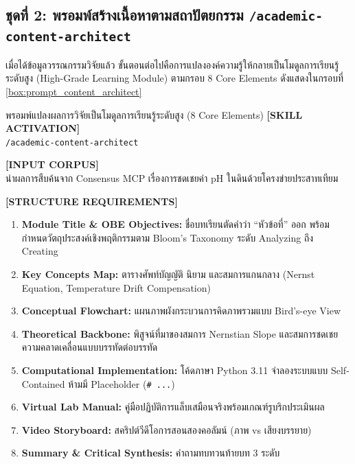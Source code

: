 \subsection{ชุดที่ 2: พรอมพ์สร้างเนื้อหาตามสถาปัตยกรรม \texttt{/academic-content-architect}}

เมื่อได้ข้อมูลวรรณกรรมวิจัยแล้ว ขั้นตอนต่อไปคือการแปลงองค์ความรู้ให้กลายเป็นโมดูลการเรียนรู้ระดับสูง (High-Grade Learning Module) ตามกรอบ 8 Core Elements ดังแสดงในกรอบที่ \ref{box:prompt_content_architect}

\begin{promptbox}{พรอมพ์แปลงผลการวิจัยเป็นโมดูลการเรียนรู้ระดับสูง (8 Core Elements)}
\small
\textbf{[SKILL ACTIVATION]}\\
\texttt{/academic-content-architect}

\vspace{4pt}
\textbf{[INPUT CORPUS]}\\
นำผลการสืบค้นจาก Consensus MCP เรื่องการชดเชยค่า pH ในดินด้วยโครงข่ายประสาทเทียม

\vspace{4pt}
\textbf{[STRUCTURE REQUIREMENTS]}
\begin{enumerate}[leftmargin=15pt, itemsep=2pt]
    \item \textbf{Module Title \& OBE Objectives:} ชื่อบทเรียนตัดคำว่า ``หัวข้อที่'' ออก พร้อมกำหนดวัตถุประสงค์เชิงพฤติกรรมตาม Bloom's Taxonomy ระดับ Analyzing ถึง Creating
    \item \textbf{Key Concepts Map:} ตารางศัพท์บัญญัติ นิยาม และสมการแกนกลาง (Nernst Equation, Temperature Drift Compensation)
    \item \textbf{Conceptual Flowchart:} แผนภาพผังกระบวนการคิดภาพรวมแบบ Bird's-eye View
    \item \textbf{Theoretical Backbone:} พิสูจน์ที่มาของสมการ Nernstian Slope และสมการชดเชยความคลาดเคลื่อนแบบบรรทัดต่อบรรทัด
    \item \textbf{Computational Implementation:} โค้ดภาษา Python 3.11 จำลองระบบแบบ Self-Contained ห้ามมี Placeholder (\texttt{\# ...})
    \item \textbf{Virtual Lab Manual:} คู่มือปฏิบัติการแล็บเสมือนจริงพร้อมเกณฑ์รูบริกประเมินผล
    \item \textbf{Video Storyboard:} สคริปต์วีดีโอการสอนสองคอลัมน์ (ภาพ vs เสียงบรรยาย)
    \item \textbf{Summary \& Critical Synthesis:} คำถามทบทวนท้ายบท 3 ระดับ
\end{enumerate}
\end{promptbox}
\label{box:prompt_content_architect}

